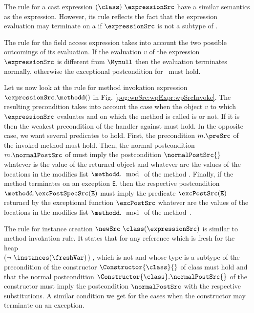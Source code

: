 The rule for a cast expression $( \class ) \ \expressionSrc$ 
  have a similar semantics as the \instanceofSrc{} expression.
 However, its rule reflects the fact that the expression evaluation may terminate on 
a \ClassCastExc{} if $ \expressionSrc$ is not a subtype of  \class.

 The rule for the field access expression takes into account
the two possible  outcomings of its evaluation. If the evaluation $v$ of the expression $\expressionSrc$ 
is different from $\Mynull$ then the evaluation terminates normally, otherwise the exceptional postcondition  
for \NullPointerExc \ must hold.

  
Let us now look at the rule for method invokation expression $ \expressionSrc.\methodd()$ in Fig. \ref{pog:wpSrc:wpExpr:wpSrcInvoke}.
The resulting precondition  takes into account the case when the  object $v$ to which $\expressionSrc $ evaluates and
 on which  the method is called is \Mynull{} or not. If it is \Mynull{} then the weakest precondition of the handler against \NullPointerExc{}
must hold. In the opposite case, we want several predicates to hold. 
First, the precondition $ m.\preSrc $  of the invoked method \methodd{} must hold. 
Then, the  normal postcondition $m.\normalPostSrc $ 
of \methodd{} must imply the postcondition  $\normalPostSrc{}$ whatever is the value of the returned object and whatever are the values of the 
locations in the modifies list $\methodd. \mod{}$  of the method \methodd. Finally, if the method \methodd{} terminates on an exception \mbox{\rm\texttt{E}},
 then the respective postcondition    $\methodd.\excPostSpecSrc(\mbox{\rm \texttt{E}})$ must imply the predicate $\excPostSrc(\mbox{\rm\texttt{E}} )$  returned by the exceptional function 
 $\excPostSrc$ whatever are the values of the locations in the modifies list  $\methodd. \mod{} $  of the method~\methodd.

The rule for instance creation  $\newSrc \ \class  ( \expressionSrc  )$ 
is similar to method invokation rule. It states that  for any reference which is
 fresh for the heap \\ 
($\neg \ \instances(\freshVar ) $) ,  which is not \Mynull and whose type is a subtype of \class{}  
the precondition of the constructor  $\Constructor{\class}{}$  of class  \class{} must hold and that the 
normal postcondition $\Constructor{\class}.\normalPostSrc{}$ of the constructor 
must imply the postcondition  $\normalPostSrc$ with the respective substitutions. A similar condition we
 get for the cases when the constructor may terminate on an exception.



